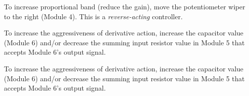 
To increase proportional band (reduce the gain), move the potentiometer wiper to the right (Module 4).  This is a {\it reverse-acting} controller.

\vskip 10pt

To increase the aggressiveness of derivative action, increase the capacitor value (Module 6) and/or decrease the summing input resistor value in Module 5 that accepts Module 6's output signal.







To increase the aggressiveness of derivative action, increase the capacitor value (Module 6) and/or decrease the summing input resistor value in Module 5 that accepts Module 6's output signal.




